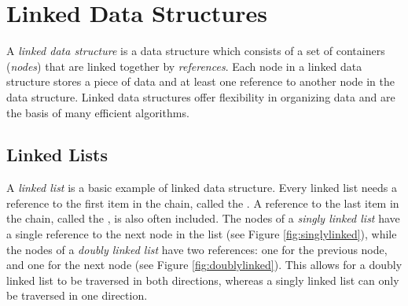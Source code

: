 

\section*{Linked Data Structures} %
A \emph{linked data structure} is a data structure which consists of a set of containers (\emph{nodes}) that are linked together by \emph{references}. 
Each node in a linked data structure stores a piece of data and at least one reference to another node in the data structure.
Linked data structures offer flexibility in organizing data and are the basis of many efficient algorithms.

\subsection*{Linked Lists} %

A \emph{linked list} is a basic example of linked data structure.
Every linked list needs a reference to the first item in the chain, called the .
A reference to the last item in the chain, called the , is also often included.
The nodes of a \emph{singly linked list} have a single reference to the next node in the list (see Figure \ref{fig:singlylinked}), while the nodes of a \emph{doubly linked list} have two references: one for the previous node, and one for the next node (see Figure \ref{fig:doublylinked}).
This allows for a doubly linked list to be traversed in both directions, whereas a singly linked list can only be traversed in one direction.


